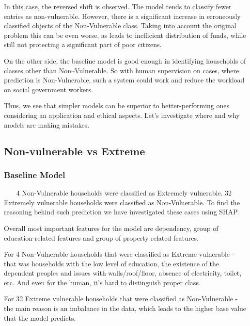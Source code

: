     In this case, the reversed shift is observed. The model tends to classify fewer entries as non-vulnerable. However, there is a significant increase in erroneously classified objects of the Non-Vulnerable class. Taking into account the original problem this can be even worse, as leads to inefficient distribution of funds, while still not protecting a significant part of poor citizens.
    
    On the other side, the baseline model is good enough in identifying households of classes other than Non--Vulnerable. So with human supervision on cases, where prediction is Non-Vulnerable, such a system could work and reduce the workload on social government workers.
    
    Thus, we see that simpler models can be superior to better-performing ones considering an application and ethical aspects. Let’s investigate where and why models are making mistakes.
    
    \subsection{Non-vulnerable vs Extreme}
    \subsubsection{Baseline Model}~~~
        4 Non-Vulnerable households were classified as Extremely vulnerable. 32 Extremely vulnerable households were classified as Non-Vulnerable. To find the reasoning behind such prediction we have investigated these cases using SHAP.
        
        Overall most important features for the model are dependency, group of education-related features and group of property related features.
        
        For 4 Non-Vulnerable households that were classified as Extreme vulnerable - that was households with the low level of education, the existence of the dependent peoples and issues with walls/roof/floor, absence of electricity, toilet, etc. And even for the human, it's hard to distinguish proper class.
        
        For 32 Extreme vulnerable households that were classified as Non-Vulnerable - the main reason is an imbalance in the data, which leads to the higher base value that the model predicts. 
        
